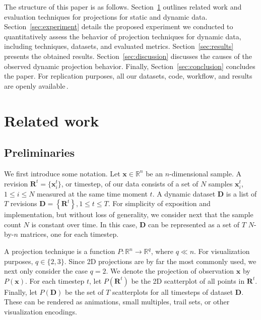 The structure of this paper is as follows. Section~\ref{sec:related} outlines related work and evaluation techniques for projections for static and dynamic data. Section~\ref{sec:experiment} details the proposed experiment we conducted to quantitatively assess the behavior of projection techniques for dynamic data, including techniques, datasets, and evaluated metrics. Section~\ref{sec:results} presents the obtained results. Section~\ref{sec:discussion} discusses the causes of the observed dynamic projection behavior. Finally, Section~\ref{sec:conclusion} concludes the paper. For replication purposes, all our datasets, code, workflow, and results are openly available\,\cite{repo}.


\section{Related work}
\label{sec:related}

\subsection{Preliminaries}
\label{sec:preliminaries}
%
We first introduce some notation. Let
$\mathbf{x} \in \mathbb{R}^n$
be an $n$-dimensional sample. A revision $\mathbf{R}^t = \{\mathbf{x}_i^t\}$, or timestep, of our data consists of a set of $N$ samples $\mathbf{x}_i^t$, $1 \leq i \leq N$ measured at the same time moment $t$. A dynamic dataset $\mathbf{D}$ is a list of $T$ revisions $\mathbf{D}=\left \{ \mathbf{R}^{t} \right \}, 1 \leq t \leq T$. For simplicity of exposition and implementation, but without loss of generality, we consider next that the sample count $N$ is constant over time. In this case, $\mathbf{D}$ can be represented as a set of $T$ $N$-by-$n$ matrices, one for each timestep.

A projection technique is a function $P: \mathbb{R}^{n} \rightarrow \mathbb{R}^{q}$, where $q \ll n$. For visualization purposes, $q \in \{2,3\}$. Since 2D projections are by far the most commonly used, we next only consider the case $q=2$. We denote the projection of observation $\mathbf{x}$ by $P(\mathbf{x})$. For each timestep $t$, let $P(\mathbf{R}^{t})$ be the 2D scatterplot of all points in
$\mathbf{R}^{t}$. Finally, let $P(\mathbf{D})$ be the set of $T$ scatterplots for all timesteps of dataset $\mathbf{D}$. These can be rendered as animations, small multiples, trail sets, or other visualization encodings.

